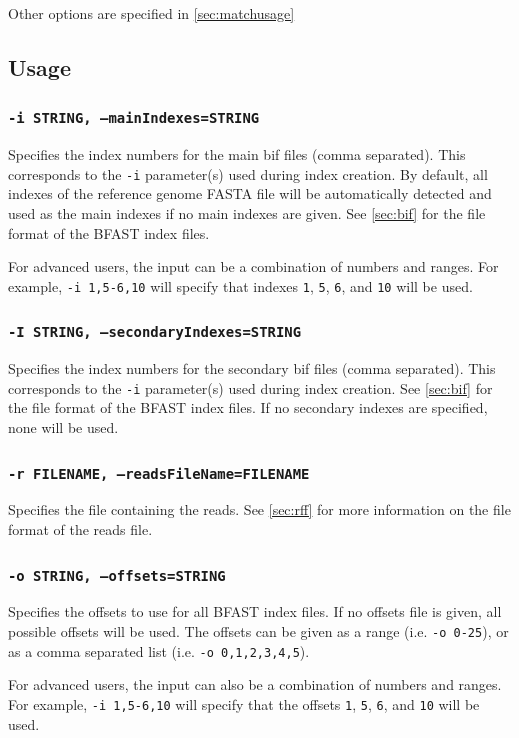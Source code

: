 \documentclass[a4paper,12pt]{book}
\newcommand{\TT}[1]{{\tt #1}} %
\newcommand{\rGFF}{reference genome FASTA file}
\newcommand{\BIF}{BFAST index file} %
\begin{document}
Other options are specified in \autoref{sec:matchusage}

\subsection{Usage}
\label{sec:matchusage}

\subsubsection{\TT{-i STRING, --mainIndexes=STRING}}
Specifies the index numbers for the main bif files (comma separated).
This corresponds to the \TT{-i} parameter(s) used during index creation.
By default, all indexes of the \rGFF{} will be automatically detected and used as the main indexes if no main indexes are given.
See \autoref{sec:bif} for the file format of the \BIF{s}.

For advanced users, the input can be a combination of numbers and ranges.
For example, \TT{-i 1,5-6,10} will specify that indexes \TT{1}, \TT{5}, \TT{6}, and \TT{10} will be used.

\subsubsection{\TT{-I STRING, --secondaryIndexes=STRING}}
Specifies the index numbers for the secondary bif files (comma separated).
This corresponds to the \TT{-i} parameter(s) used during index creation.
See \autoref{sec:bif} for the file format of the \BIF{s}.
If no secondary indexes are specified, none will be used.

\subsubsection{\TT{-r FILENAME, --readsFileName=FILENAME}}
Specifies the file containing the reads.
See \autoref{sec:rff} for more information on the file format of the reads file.

\subsubsection{\TT{-o STRING, --offsets=STRING}}
Specifies the offsets to use for all \BIF{s}.
If no offsets file is given, all possible offsets will be used.
The offsets can be given as a range (i.e. \TT{-o 0-25}), or as a comma separated list (i.e. \TT{-o 0,1,2,3,4,5}).

For advanced users, the input can also be a combination of numbers and ranges.
For example, \TT{-i 1,5-6,10} will specify that the offsets \TT{1}, \TT{5}, \TT{6}, and \TT{10} will be used.
\end{document}
